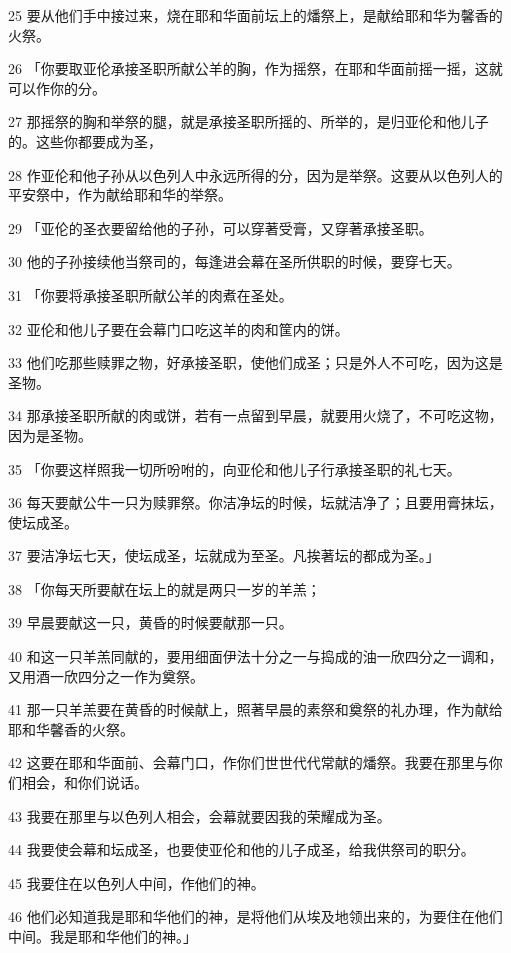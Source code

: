 \par 25 要从他们手中接过来，烧在耶和华面前坛上的燔祭上，是献给耶和华为馨香的火祭。
\par 26 「你要取亚伦承接圣职所献公羊的胸，作为摇祭，在耶和华面前摇一摇，这就可以作你的分。
\par 27 那摇祭的胸和举祭的腿，就是承接圣职所摇的、所举的，是归亚伦和他儿子的。这些你都要成为圣，
\par 28 作亚伦和他子孙从以色列人中永远所得的分，因为是举祭。这要从以色列人的平安祭中，作为献给耶和华的举祭。
\par 29 「亚伦的圣衣要留给他的子孙，可以穿著受膏，又穿著承接圣职。
\par 30 他的子孙接续他当祭司的，每逢进会幕在圣所供职的时候，要穿七天。
\par 31 「你要将承接圣职所献公羊的肉煮在圣处。
\par 32 亚伦和他儿子要在会幕门口吃这羊的肉和筐内的饼。
\par 33 他们吃那些赎罪之物，好承接圣职，使他们成圣；只是外人不可吃，因为这是圣物。
\par 34 那承接圣职所献的肉或饼，若有一点留到早晨，就要用火烧了，不可吃这物，因为是圣物。
\par 35 「你要这样照我一切所吩咐的，向亚伦和他儿子行承接圣职的礼七天。
\par 36 每天要献公牛一只为赎罪祭。你洁净坛的时候，坛就洁净了；且要用膏抹坛，使坛成圣。
\par 37 要洁净坛七天，使坛成圣，坛就成为至圣。凡挨著坛的都成为圣。」
\par 38 「你每天所要献在坛上的就是两只一岁的羊羔；
\par 39 早晨要献这一只，黄昏的时候要献那一只。
\par 40 和这一只羊羔同献的，要用细面伊法十分之一与捣成的油一欣四分之一调和，又用酒一欣四分之一作为奠祭。
\par 41 那一只羊羔要在黄昏的时候献上，照著早晨的素祭和奠祭的礼办理，作为献给耶和华馨香的火祭。
\par 42 这要在耶和华面前、会幕门口，作你们世世代代常献的燔祭。我要在那里与你们相会，和你们说话。
\par 43 我要在那里与以色列人相会，会幕就要因我的荣耀成为圣。
\par 44 我要使会幕和坛成圣，也要使亚伦和他的儿子成圣，给我供祭司的职分。
\par 45 我要住在以色列人中间，作他们的神。
\par 46 他们必知道我是耶和华他们的神，是将他们从埃及地领出来的，为要住在他们中间。我是耶和华他们的神。」

